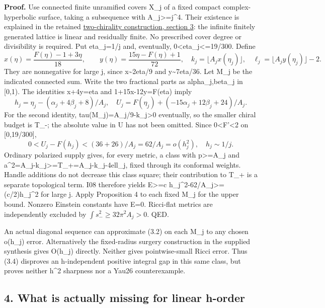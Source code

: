 \documentclass[
  10pt,
]{article}
\begin{document}
\textbf{Proof.} Use connected finite unramified covers X\_j of a fixed
compact complex-hyperbolic surface, taking a subsequence with
A\_j\textgreater=j\^{}4. Their existence is explained in the retained
\href{../mathematics/current/line1_two_chirality_topology.md}{two-chirality
construction, section 3}: the infinite finitely generated lattice is
linear and residually finite. No prescribed cover degree or divisibility
is required. Put eta\_j=1/j and, eventually,
0\textless eta\_j\textless=19/300. Define \[
 x(\eta)=\frac{F(\eta)-1+3\eta}{18},\qquad
 y(\eta)=\frac{15\eta-F(\eta)+1}{72},
 \quad k_j=\lfloor A_jx(\eta_j)\rfloor,\quad
 \ell_j=\lfloor A_jy(\eta_j)\rfloor-2.                   \tag{3.5}
\] They are nonnegative for large j, since x\textasciitilde2eta/9 and
y\textasciitilde7eta/36. Let M\_j be the indicated connected sum. Write
the two fractional parts as alpha\_j,beta\_j in {[}0,1). The identities
x+4y=eta and 1+15x-12y=F(eta) imply \[
 h_j=\eta_j-(\alpha_j+4\beta_j+8)/A_j,
 \quad U_j=F(\eta_j)+(-15\alpha_j+12\beta_j+24)/A_j.       \tag{3.6}
\] For the second identity, tau(M\_j)=A\_j/9-k\_j\textgreater0
eventually, so the smaller chiral budget is T\_-; the absolute value in
U has not been omitted. Since 0\textless F'\textless2 on {[}0,19/300{]},
\[
 0<U_j-F(h_j)<(36+26)/A_j=62/A_j=o(h_j^2),\quad h_j\sim1/j.
\] Ordinary polarized supply gives, for every metric, a class with
p\textgreater=A\_j and
a\^{}2=A\_j-k\_j\textgreater=T\_+=A\_j-k\_j-4ell\_j, fixed through its
conformal weights. Handle additions do not decrease this class square;
their contribution to T\_+ is a separate topological term. I08 therefore
yields E\textgreater=c h\_j\^{}2-62/A\_j\textgreater=(c/2)h\_j\^{}2 for
large j. Apply Proposition 4 to each fixed M\_j for the upper bound.
Nonzero Einstein constants have E=0. Ricci-flat metrics are
independently excluded by \(\int s_-^2\ge32\pi^2A_j>0\). QED.

An actual diagonal sequence can approximate (3.2) on each M\_j to any
chosen o(h\_j) error. Alternatively the fixed-radius surgery
construction in the supplied synthesis gives O(h\_j) directly. Neither
gives pointwise-small Ricci error. Thus (3.4) disproves an h-independent
positive integral gap in this same class, but proves neither h\^{}2
sharpness nor a Yau26 counterexample.

\hypertarget{what-is-actually-missing-for-linear-h-order}{%
\subsection{4. What is actually missing for linear
h-order}\label{what-is-actually-missing-for-linear-h-order}}
\end{document}
